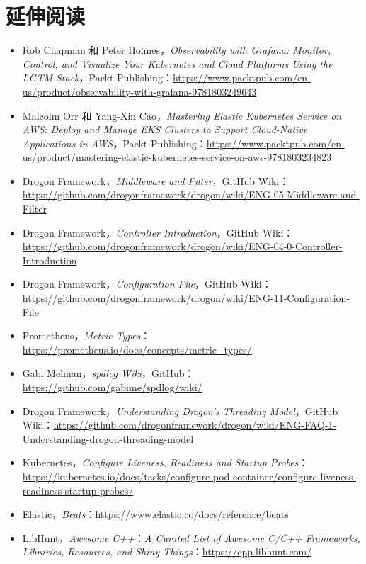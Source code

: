 \section{延伸阅读}

\begin{itemize}
\item Rob Chapman 和 Peter Holmes，\emph{Observability with Grafana: Monitor, Control, and Visualize Your Kubernetes and Cloud Platforms Using the LGTM Stack}，Packt Publishing：\href{https://www.packtpub.com/en-us/product/observability-with-grafana-9781803249643}{https://www.packtpub.com/en-us/product/observability-with-grafana-9781803249643}
\item Malcolm Orr 和 Yang-Xin Cao，\emph{Mastering Elastic Kubernetes Service on AWS:} \emph{Deploy and Manage EKS Clusters to Support Cloud-Native Applications in AWS}，Packt Publishing：\href{https://www.packtpub.com/en-us/product/mastering-elastic-kubernetes-service-on-aws-9781803234823}{https://www.packtpub.com/en-us/product/mastering-elastic-kubernetes-service-on-aws-9781803234823}
\item Drogon Framework，\emph{Middleware and Filter}，GitHub Wiki：\href{https://github.com/drogonframework/drogon/wiki/ENG-05-Middleware-and-Filter}{https://github.com/drogonframework/drogon/wiki/ENG-05-Middleware-and-Filter}
\item Drogon Framework，\emph{Controller Introduction}，GitHub Wiki：\href{https://github.com/drogonframework/drogon/wiki/ENG-04-0-Controller-Introduction}{https://github.com/drogonframework/drogon/wiki/ENG-04-0-Controller-Introduction}
\item Drogon Framework，\emph{Configuration File}，GitHub Wiki：\href{https://github.com/drogonframework/drogon/wiki/ENG-11-Configuration-File}{https://github.com/drogonframework/drogon/wiki/ENG-11-Configuration-File}
\item Prometheus，\emph{Metric Types}：\href{https://prometheus.io/docs/concepts/metric_types/}{https://prometheus.io/docs/concepts/metric\_types/}
\item Gabi Melman，\emph{spdlog Wiki}，GitHub：\href{https://github.com/gabime/spdlog/wiki/}{https://github.com/gabime/spdlog/wiki/}
\item Drogon Framework，\emph{Understanding Drogon’s Threading Model}，GitHub Wiki：\href{https://github.com/drogonframework/drogon/wiki/ENG-FAQ-1-Understanding-drogon-threading-model}{https://github.com/drogonframework/drogon/wiki/ENG-FAQ-1-Understanding-drogon-threading-model}
\item Kubernetes，\emph{Configure Liveness, Readiness and Startup Probes}：\href{https://kubernetes.io/docs/tasks/configure-pod-container/configure-liveness-readiness-startup-probes/}{https://kubernetes.io/docs/tasks/configure-pod-container/configure-liveness-readiness-startup-probes/}
\item Elastic，\emph{Beats}：\href{https://www.elastic.co/docs/reference/beats}{https://www.elastic.co/docs/reference/beats}
\item LibHunt，\emph{Awesome C++}：\emph{A Curated List of Awesome C/C++ Frameworks, Libraries, Resources, and Shiny Things}：\href{https://cpp.libhunt.com/}{https://cpp.libhunt.com/}
\end{itemize}

